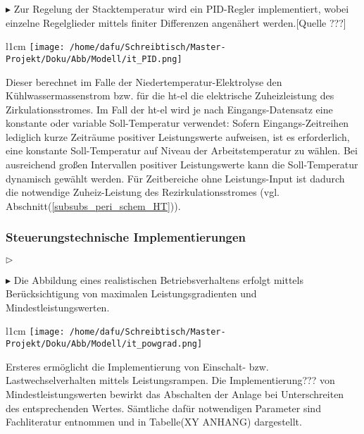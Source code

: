 \documentclass[onecolumn,10pt,titlepage]{article}
\begin{document}
$\blacktriangleright$ Zur Regelung der Stacktemperatur wird ein PID-Regler implementiert, wobei einzelne Regelglieder mittels finiter Differenzen angenähert werden.[Quelle ???]

\begin{wrapfigure}{l}{1cm}
	\texttt{[image: /home/dafu/Schreibtisch/Master-Projekt/Doku/Abb/Modell/it\_PID.png]}
\end{wrapfigure}
Dieser berechnet im Falle der Niedertemperatur-Elektrolyse den Kühlwassermassenstrom bzw. für die \gls{ht}-\gls{el} die elektrische Zuheizleistung des Zirkulationsstromes. Im Fall der \gls{ht}-\gls{el} wird je nach Eingangs-Datensatz eine konstante oder variable Soll-Temperatur verwendet: Sofern Eingangs-Zeitreihen lediglich kurze Zeiträume positiver Leistungswerte aufweisen, ist es erforderlich, eine konstante Soll-Temperatur auf Niveau der Arbeitstemperatur zu wählen. Bei ausreichend großen Intervallen positiver Leistungswerte kann die Soll-Temperatur dynamisch gewählt werden. Für Zeitbereiche ohne Leistungs-Input ist dadurch die notwendige Zuheiz-Leistung des Rezirkulationsstromes (vgl. Abschnitt(\ref{subsubs_peri_schem_HT})).
\newline


\subsubsection{Steuerungstechnische Implementierungen}
\label{subsubs_mod_Anlagen-strg}

$\triangleright$ 
\newline

$\blacktriangleright$ 
Die Abbildung eines realistischen Betriebsverhaltens erfolgt mittels Berücksichtigung von maximalen Leistungsgradienten und Mindestleistungswerten.
\begin{wrapfigure}{l}{1cm}
	\texttt{[image: /home/dafu/Schreibtisch/Master-Projekt/Doku/Abb/Modell/it\_powgrad.png]}
\end{wrapfigure} Ersteres ermöglicht die Implementierung von Einschalt- bzw. Lastwechselverhalten mittels Leistungsrampen. Die Implementierung??? von Mindestleistungswerten bewirkt das Abschalten der Anlage bei Unterschreiten des entsprechenden Wertes. Sämtliche dafür notwendigen Parameter sind Fachliteratur \cite{Buttler2018} entnommen und in Tabelle(XY ANHANG) dargestellt. 
\newline
\end{document}
